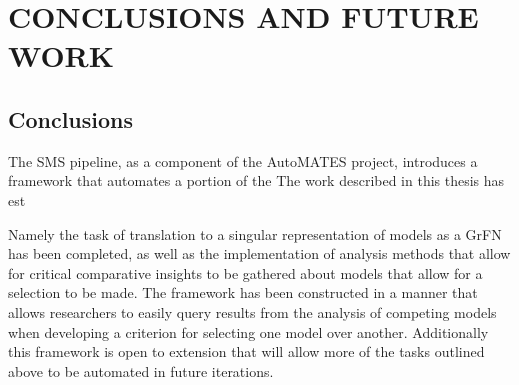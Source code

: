 \chapter{CONCLUSIONS AND FUTURE WORK\label{chapter:conc_and_future}}

\section{Conclusions\label{sec:conclusions}}



The SMS pipeline, as a component of the AutoMATES project, introduces a framework that automates a portion of the 
The work described in this thesis has est

Namely the task of translation to a singular representation of models as a GrFN has been completed, as well as the implementation of analysis methods that allow for critical comparative insights to be gathered about models that allow for a selection to be made.
The framework has been constructed in a manner that allows researchers to easily query results from the analysis of competing models when developing a criterion for selecting one model over another.
Additionally this framework is open to extension that will allow more of the tasks outlined above to be automated in future iterations.

